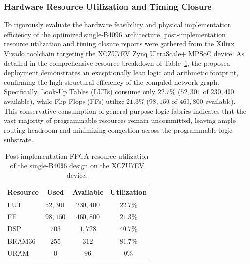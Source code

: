 \documentclass[algorithms,article,submit,moreauthors]{Definitions/mdpi}
\begin{document}
\begin{table}[h!]
\centering
\caption{Comparative workflow latency and throughput metrics across deployment pathways on the B4096 accelerator.}
\label{tab:latency}
\end{table}

\subsubsection{Hardware Resource Utilization and Timing Closure}

To rigorously evaluate the hardware feasibility and physical implementation efficiency of the optimized single-B4096 architecture, post-implementation resource utilization and timing closure reports were gathered from the Xilinx Vivado toolchain targeting the XCZU7EV Zynq UltraScale+ MPSoC device. As detailed in the comprehensive resource breakdown of Table~\ref{tab:resources}, the proposed deployment demonstrates an exceptionally lean logic and arithmetic footprint, confirming the high structural efficiency of the compiled network graph. Specifically, Look-Up Tables (LUTs) consume only $22.7\%$ ($52{,}301$ of $230{,}400$ available), while Flip-Flops (FFs) utilize $21.3\%$ ($98{,}150$ of $460{,}800$ available). This conservative consumption of general-purpose logic fabrics indicates that the vast majority of programmable resources remain uncommitted, leaving ample routing headroom and minimizing congestion across the programmable logic substrate.

\begin{table}[h!]
\centering
\caption{Post-implementation FPGA resource utilization of the single-B4096 design on the XCZU7EV device.}
\label{tab:resources}
\setlength{\tabcolsep}{6pt}\renewcommand{\arraystretch}{1.2}
\begin{tabular}{lccc}
\toprule
Resource & Used & Available & Utilization\\
\midrule
LUT     & $52{,}301$ & $230{,}400$ & $22.7\%$\\
FF      & $98{,}150$ & $460{,}800$ & $21.3\%$\\
DSP     & $703$      & $1{,}728$   & $40.7\%$\\
BRAM36  & $255$      & $312$       & \textbf{$81.7\%$}\\
URAM    & $0$        & $96$        & $0\%$\\
\bottomrule
\end{tabular}
\end{table}
\end{document}
